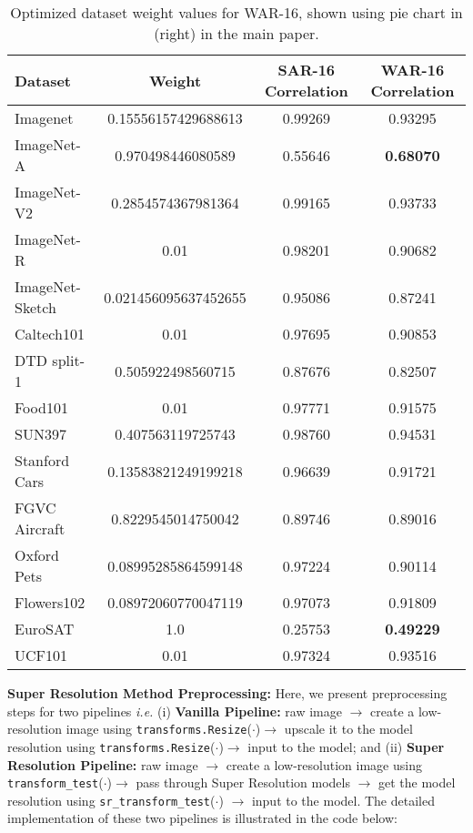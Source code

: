 \begin{table}[!h]
  \caption{Optimized dataset weight values for WAR-16, shown using pie chart in  (right) in the main paper.}
  \label{tab:dataset_weight_value}
  \centering
  \setlength\tabcolsep{2pt}
  \begin{tabular}{l|c|c|c}
    \toprule
    Dataset & Weight & SAR-16 Correlation & WAR-16 Correlation\\ 
    \midrule
    Imagenet & 0.15556157429688613 & 0.99269 & 0.93295 \\ 
    \rowcolor{mygray} 
    ImageNet-A & 0.970498446080589 & 0.55646 & \textbf{0.68070} \\
    ImageNet-V2 & 0.2854574367981364 & 0.99165 & 0.93733 \\ 
    ImageNet-R & 0.01 & 0.98201 & 0.90682 \\
    ImageNet-Sketch & 0.021456095637452655 & 0.95086 & 0.87241 \\
    Caltech101 & 0.01 & 0.97695 & 0.90853 \\
    DTD split-1 & 0.505922498560715 & 0.87676 & 0.82507 \\
    Food101 & 0.01 & 0.97771 & 0.91575 \\
    SUN397 & 0.407563119725743 & 0.98760 & 0.94531 \\
    Stanford Cars & 0.13583821249199218 & 0.96639 & 0.91721 \\
    FGVC Aircraft & 0.8229545014750042 & 0.89746 & 0.89016 \\
    Oxford Pets & 0.08995285864599148 & 0.97224 & 0.90114 \\
    Flowers102 & 0.08972060770047119 & 0.97073 & 0.91809 \\
    \rowcolor{mygray} 
    EuroSAT & 1.0 & 0.25753 & \textbf{0.49229} \\
    UCF101 & 0.01 & 0.97324 & 0.93516 \\

    \hline
  \bottomrule
  \end{tabular}
\end{table}


\noindent \textbf{Super Resolution Method Preprocessing:} 
Here, we present preprocessing steps for two pipelines \emph{i.e.} (i) \textbf{Vanilla Pipeline:} raw image $\rightarrow$ create a low-resolution image using \texttt{transforms.Resize}\:($\cdot$)\:$\rightarrow$ upscale it to the model resolution using \texttt{transforms.Resize}\:($\cdot$)\:$\rightarrow$ input to the model; and (ii) \textbf{Super Resolution Pipeline:} raw image $\rightarrow$ create a low-resolution image using \texttt{transform\_test}\:($\cdot$)$\rightarrow$ pass through Super Resolution models $\rightarrow$ get the model resolution using \texttt{sr\_transform\_test}\:($\cdot$) $\rightarrow$ input to the model. The detailed implementation of these two pipelines is illustrated in the code below:

